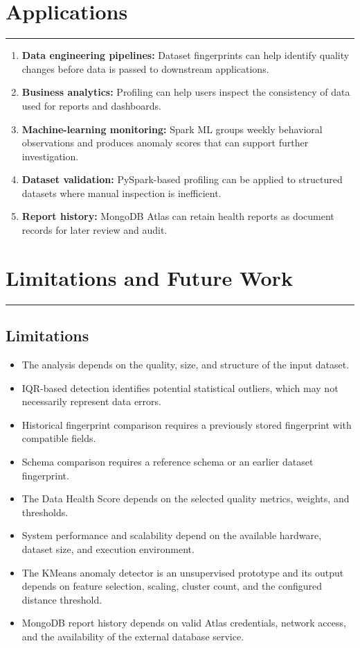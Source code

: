 \documentclass[12pt,a4paper]{report}
\begin{document}
\chapter{Applications}
\rule{\textwidth}{2pt}

\begin{enumerate}
    \item \textbf{Data engineering pipelines:} Dataset fingerprints can help identify quality changes before data is passed to downstream applications.
    \item \textbf{Business analytics:} Profiling can help users inspect the consistency of data used for reports and dashboards.
    \item \textbf{Machine-learning monitoring:} Spark ML groups weekly behavioral observations and produces anomaly scores that can support further investigation.
    \item \textbf{Dataset validation:} PySpark-based profiling can be applied to structured datasets where manual inspection is inefficient.
    \item \textbf{Report history:} MongoDB Atlas can retain health reports as document records for later review and audit.
\end{enumerate}




\chapter{Limitations and Future Work}
\rule{\textwidth}{2pt}

\section{Limitations}
\begin{itemize}
    \item The analysis depends on the quality, size, and structure of the input dataset.
    \item IQR-based detection identifies potential statistical outliers, which may not necessarily represent data errors.
    \item Historical fingerprint comparison requires a previously stored fingerprint with compatible fields.
    \item Schema comparison requires a reference schema or an earlier dataset fingerprint.
    \item The Data Health Score depends on the selected quality metrics, weights, and thresholds.
    \item System performance and scalability depend on the available hardware, dataset size, and execution environment.
    \item The KMeans anomaly detector is an unsupervised prototype and its output depends on feature selection, scaling, cluster count, and the configured distance threshold.
    \item MongoDB report history depends on valid Atlas credentials, network access, and the availability of the external database service.
\end{itemize}
\end{document}
